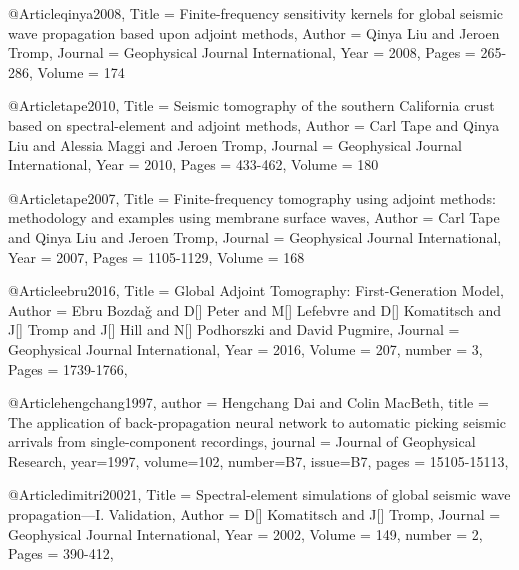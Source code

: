 @Article{qinya2008,
  Title                    = {Finite-frequency sensitivity kernels for global seismic wave propagation based upon adjoint methods},
  Author                   = {Qinya Liu and Jeroen Tromp},
  Journal                  = {Geophysical Journal International},
  Year                     = {2008},
  Pages                    = {265-286},
  Volume                   = {174}
}


@Article{tape2010,
  Title                    = {Seismic tomography of the southern {C}alifornia crust based on spectral-element and adjoint methods},
  Author                   = {Carl Tape and Qinya Liu and Alessia Maggi and Jeroen Tromp},
  Journal                  = Geophysical Journal International,
  Year                     = {2010},
  Pages                    = {433-462},
  Volume                   = {180}
}

@Article{tape2007,
  Title                    = {Finite-frequency tomography using adjoint methods: methodology and examples using membrane surface waves},
  Author                   = {Carl Tape and Qinya Liu and Jeroen Tromp},
  Journal                  = Geophysical Journal International,
  Year                     = {2007},
  Pages                    = {1105-1129},
  Volume                   = {168}
}

@Article{ebru2016,
  Title                    = {Global Adjoint Tomography: First-Generation Model},
  Author                   = {Ebru Bozda\v{g} and D[] Peter and M[] Lefebvre and D[] Komatitsch and J[] Tromp and J[] Hill and N[] Podhorszki and David Pugmire},
  Journal                  = Geophysical Journal International,
  Year                     = {2016},
  Volume                   = {207},
  number                   = {3},
  Pages                    = {1739-1766},
}

@Article{hengchang1997,
  author =	 {Hengchang Dai and Colin MacBeth},
  title =	 {The application of back-propagation neural network to automatic picking seismic arrivals from single-component recordings},
  journal =	 {Journal of Geophysical Research},
  year=1997,
  volume=102,
  number=B7,
  issue=B7,
  pages =	 {15105-15113},
}


@Article{dimitri20021,
  Title                    = {Spectral-element simulations of global seismic wave propagation—I. Validation},
  Author                   = {D[] Komatitsch and J[] Tromp},
  Journal                  = Geophysical Journal International,
  Year                     = {2002},
  Volume                   = {149},
  number                   = {2},
  Pages                    = {390-412},
}

